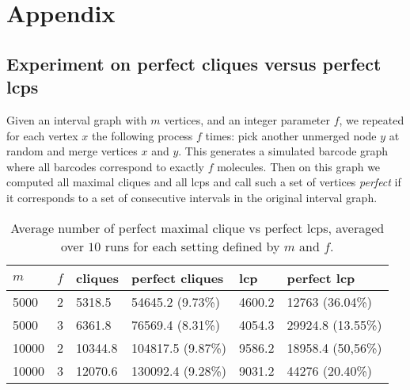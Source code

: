 \setcounter{table}{0}
\renewcommand{\thetable}{A\arabic{table}}

\section{Appendix}

\subsection{Experiment on perfect cliques versus perfect lcps \label{appendix:perfectlcps}}

Given an interval graph with $m$ vertices, and an integer parameter $f$, we repeated for each vertex $x$ the following process $f$ times: pick another unmerged node $y$ at random and merge vertices $x$ and $y$. This generates a simulated barcode graph where all barcodes correspond to exactly $f$ molecules. Then on this graph we computed all maximal cliques and all lcps and call such a set of vertices \textit{perfect} if it corresponds to a set of consecutive intervals in the original interval graph.

\begin{table}[h!]
    \begin{tabular}{|l|l|l|l||l|l|}
        \hline
        $m$ & $f$ & cliques & perfect cliques & lcp & perfect lcp \tabularnewline
        \hline
        5000 & 2 & 5318.5 & 54645.2 (9.73\%) & 4600.2 & 12763 (36.04\%) \tabularnewline
        \hline
        5000 & 3 & 6361.8 & 76569.4 (8.31\%) & 4054.3 & 29924.8 (13.55\%) \tabularnewline
        \hline
        10000 & 2 & 10344.8 & 104817.5 (9.87\%) & 9586.2 & 18958.4 (50,56\%) \tabularnewline
        \hline
        10000 & 3 & 12070.6 & 130092.4 (9.28\%) & 9031.2 & 44276 (20.40\%) \tabularnewline
        \hline
    \end{tabular}
    \caption{Average number of perfect maximal clique vs perfect lcps, averaged over $10$ runs for each setting defined by $m$ and $f$.
    \label{tab:clqvslcp}}
\end{table}
 